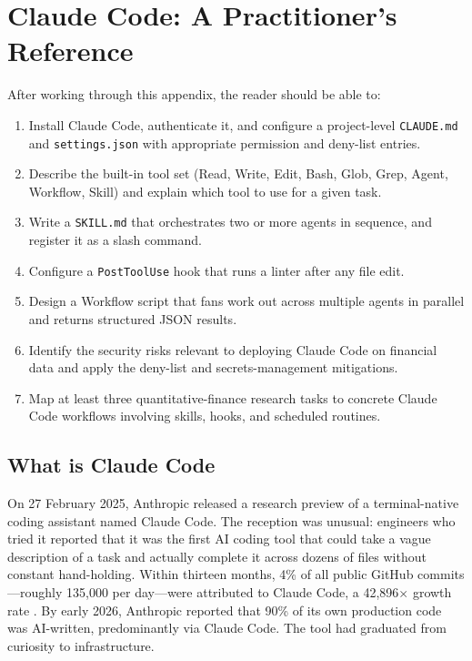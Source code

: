 \chapter{Claude Code: A Practitioner's Reference}
\label{app:claude-code}

\begin{remark}
After working through this appendix, the reader should be able to:
\begin{enumerate}
  \item Install Claude Code, authenticate it, and configure a project-level
        \texttt{CLAUDE.md} and \texttt{settings.json} with appropriate
        permission and deny-list entries.
  \item Describe the built-in tool set (Read, Write, Edit, Bash, Glob, Grep,
        Agent, Workflow, Skill) and explain which tool to use for a given task.
  \item Write a \texttt{SKILL.md} that orchestrates two or more agents in
        sequence, and register it as a slash command.
  \item Configure a \texttt{PostToolUse} hook that runs a linter after any
        file edit.
  \item Design a Workflow script that fans work out across multiple agents in
        parallel and returns structured JSON results.
  \item Identify the security risks relevant to deploying Claude Code on
        financial data and apply the deny-list and secrets-management mitigations.
  \item Map at least three quantitative-finance research tasks to concrete
        Claude Code workflows involving skills, hooks, and scheduled routines.
\end{enumerate}
\end{remark}

\section{What is Claude Code}
\label{app:claude-code:overview}

\begin{context}
On 27 February 2025, Anthropic released a research preview of a terminal-native
coding assistant named Claude Code.  The reception was unusual: engineers who
tried it reported that it was the first AI coding tool that could take a vague
description of a task and actually complete it across dozens of files without
constant hand-holding.  Within thirteen months, 4\% of all public GitHub
commits---roughly 135{,}000 per day---were attributed to Claude Code, a
42{,}896$\times$ growth rate \citep{anthropic2025claudecode}.  By early 2026,
Anthropic reported that 90\% of its own production code was AI-written,
predominantly via Claude Code.  The tool had graduated from curiosity to
infrastructure.
\end{context}

